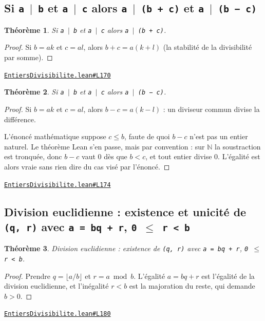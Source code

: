\documentclass[11pt,a4paper]{article}
\theoremstyle{definition}
\theoremstyle{plain}
\newtheorem{theoreme}{Théorème}
\newcommand{\source}[2]{\par\smallskip\noindent\hfill{\footnotesize\href{#1}{\texttt{#2}}}\par\smallskip}
\begin{document}
\subsection{Si \texttt{a \(\mid\) b} et \texttt{a \(\mid\) c} alors \texttt{a \(\mid\) (b + c)} et \texttt{a \(\mid\) (b − c)}}

\begin{theoreme}
Si \texttt{a \(\mid\) b} et \texttt{a \(\mid\) c} alors \texttt{a \(\mid\) (b + c)}.
\end{theoreme}

\begin{proof}
Si $b = ak$ et $c = al$, alors $b + c = a(k+l)$ (la stabilité de la divisibilité par somme).
\end{proof}
\source{https://github.com/Commutator-IO/learn-lean/blob/main/cours/01-college/01-nombres-et-calculs/EntiersDivisibilite.lean\#L170}{EntiersDivisibilite.lean\#L170}

\begin{theoreme}
Si \texttt{a \(\mid\) b} et \texttt{a \(\mid\) c} alors \texttt{a \(\mid\) (b − c)}.
\end{theoreme}

\begin{proof}
Si $b = ak$ et $c = al$, alors $b - c = a(k - l)$ : un diviseur commun divise la
différence.

L'énoncé mathématique suppose $c \le b$, faute de quoi $b - c$ n'est pas un entier naturel.
Le théorème Lean s'en passe, mais par convention : sur $\mathbb{N}$ la soustraction est
tronquée, donc $b - c$ vaut $0$ dès que $b < c$, et tout entier divise $0$. L'égalité est
alors vraie sans rien dire du cas visé par l'énoncé.
\end{proof}
\source{https://github.com/Commutator-IO/learn-lean/blob/main/cours/01-college/01-nombres-et-calculs/EntiersDivisibilite.lean\#L174}{EntiersDivisibilite.lean\#L174}

\subsection{Division euclidienne : existence et unicité de \texttt{(q, r)} avec \texttt{a = bq + r}, \texttt{0 \(\le\) r < b}}

\begin{theoreme}
Division euclidienne : existence de \texttt{(q, r)} avec \texttt{a = bq + r}, \texttt{0 \(\le\) r < b}.
\end{theoreme}

\begin{proof}
Prendre $q = \lfloor a/b \rfloor$ et $r = a \bmod b$. L'égalité $a = bq + r$ est
l'égalité de la division euclidienne, et l'inégalité $r < b$ est la majoration du reste, qui demande
$b > 0$.
\end{proof}
\source{https://github.com/Commutator-IO/learn-lean/blob/main/cours/01-college/01-nombres-et-calculs/EntiersDivisibilite.lean\#L180}{EntiersDivisibilite.lean\#L180}
\end{document}
